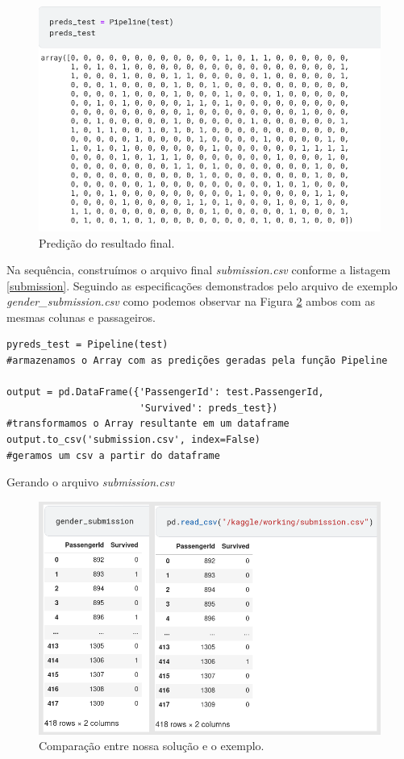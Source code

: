 \documentclass{article}
\begin{document}
\begin{figure}[!h]
 \centering
 \includegraphics[width=\textwidth]{Figures/preds_teste.png}
 \caption{Predição do resultado final.}
 \label{preds_teste}
\end{figure}

\newpage
Na sequência, construímos o arquivo final \emph{submission.csv} conforme a listagem \ref{submission}. Seguindo as especificações demonstrados pelo arquivo de exemplo \emph{gender\_submission.csv} como podemos observar na Figura \ref{genderVsubmission} ambos com as mesmas colunas e passageiros. 
\begin{listing}[!ht]
\begin{verbatim}
pyreds_test = Pipeline(test)
#armazenamos o Array com as predições geradas pela função Pipeline

output = pd.DataFrame({'PassengerId': test.PassengerId,
                       'Survived': preds_test})
#transformamos o Array resultante em um dataframe
output.to_csv('submission.csv', index=False)
#geramos um csv a partir do dataframe
\end{verbatim}
\caption{Gerando o arquivo \emph{submission.csv}}
\label{submission}
\end{listing}

\begin{figure}[!h]
 \centering
 \includegraphics[width=\textwidth]{Figures/gender_output.png}
 \caption{Comparação entre nossa solução e o exemplo.}
 \label{genderVsubmission}
\end{figure}
\end{document}
